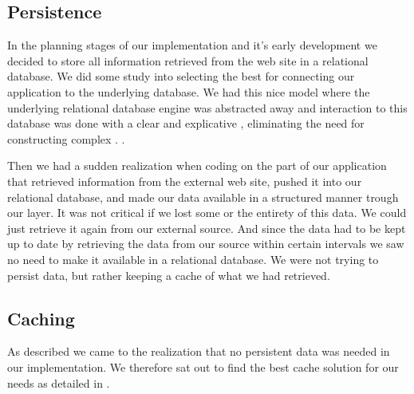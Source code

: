 \subsection{Persistence}
In the planning stages of our implementation and it's early development we
decided to store all information retrieved from the \urort{} web site
in a relational database. We did some study into selecting the best
%
for connecting our application to the underlying database. We had this nice
model where the underlying relational database engine was abstracted away
and interaction to this database was done with a clear and explicative
%
,
eliminating the need for constructing complex .%
.

Then we had a sudden realization when coding on the part of our application
that retrieved information from the external \urort{} web site, pushed it into
our relational database, and made our data available in a structured manner
trough our  layer. It was not critical if we lost some or the
entirety of this data. We could just retrieve it again from our external
source. And since the data had to be kept up to date by retrieving the data
from our source within certain intervals we saw no need to make it available
in a relational database. We were not trying to persist data, but rather
keeping a cache of what we had retrieved.


\subsection{Caching}
As described we came to the realization that no persistent data was needed
in our implementation.
We therefore sat out to find the best cache solution for our needs as detailed
in .

